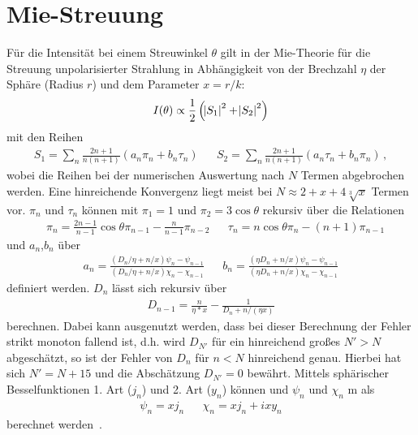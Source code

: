 \chapter{Mie-Streuung}
\label{app:mie}
Für die Intensität bei einem Streuwinkel $\theta$ gilt in der Mie-Theorie für die Streuung unpolarisierter Strahlung in Abhängigkeit von der Brechzahl $\eta$ der Sphäre (Radius $r$) und dem Parameter $x=r/k$:
\begin{equation}
	I(\theta)\propto\frac{1}{2}\left(\abs{S_1}^2+\abs{S_2}^2\right)
\end{equation} 
mit den Reihen
\begin{align}
	S_1=\sum_n{\frac{2n+1}{n(n+1)}(a_n\pi_n+b_n\tau_n)} &   & S_2=\sum_n{\frac{2n+1}{n(n+1)}(a_n\tau_n+b_n\pi_n)}\,, 
\end{align}
wobei die Reihen bei der numerischen Auswertung nach $N$ Termen abgebrochen werden. Eine hinreichende Konvergenz liegt meist bei $N\approx2+x+4\sqrt[3]{x}$ Termen vor.  $\pi_n$ und $\tau_n$ können mit $\pi_1=1$ und  $\pi_2=3\cos{\theta}$ rekursiv über die Relationen
\begin{align}
	  & \pi_n=\frac{2n-1}{n-1}\cos{\theta}\pi_{n-1}-\frac{n}{n-1}\pi_{n-2} &   & \tau_n=n\cos{\theta}\pi_n-(n+1)\pi_{n-1}
\end{align}
und $a_n$,$b_n$ über 
\begin{align}
	a_n=\frac{(D_n/\eta+n/x)\psi_n-\psi_{n-1}}{(D_n/\eta+n/x)\chi_n-\chi_{n-1}} &   &   
	b_n=\frac{(\eta D_n+n/x)\psi_n-\psi_{n-1}}{(\eta D_n+n/x)\chi_n-\chi_{n-1}}
\end{align} definiert werden. $D_n$ lässt sich rekursiv über
\begin{align}
	D_{n-1}=\frac{n}{\eta*x}-\frac{1}{D_n+n/(\eta x)} 
\end{align} 
berechnen. Dabei kann ausgenutzt werden, dass bei dieser Berechnung der Fehler strikt monoton fallend ist, d.h. wird $D_{N'}$ für ein hinreichend großes $N'>N$ abgeschätzt, so ist der Fehler von $D_n$ für $n<N$ hinreichend genau. Hierbei hat sich $N'=N+15$ und die Abschätzung $D_{N'}=0$ bewährt. Mittels sphärischer Besselfunktionen 1. Art ($j_n$) und 2. Art ($y_n$) können und $\psi_n$ und $\chi_n$ m als 
\begin{align}
	\psi_n=x j_n &   & \chi_n=x j_n+ixy_n 
\end{align}
berechnet werden~\cite{bohren1983,maetzler2002}.

